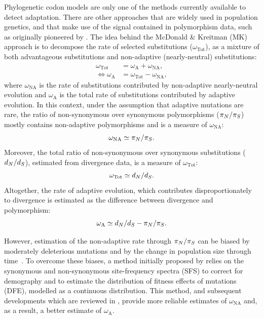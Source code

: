 Phylogenetic \gls{codon} models are only one of the methods currently available to detect adaptation.
There are other approaches that are widely used in population genetics, and that make use of the signal contained in polymorphism data, such as originally pioneered by \citet{McDonald1991}.
The idea behind the McDonald \& Kreitman (\acrshort{MK}) approach is to decompose the rate of selected \glspl{substitution} ($\omega_{\text{Tot}}$), as a mixture of both advantageous \glspl{substitution} and non-adaptive (\gls{nearly-neutral}) \glspl{substitution}:
\begin{align}
    \omega_{\text{Tot}} & = \omega_{\text{A}} + \omega_{\text{NA}}, \\
    \iff \omega_{\text{A}} & = \omega_{\text{Tot}} - \omega_{\text{NA}},
\end{align}
where $\omega_{\text{NA}}$ is the rate of \glspl{substitution} contributed by non-adaptive \gls{nearly-neutral} evolution and $\omega_{\text{A}}$ is the total rate of \glspl{substitution} contributed by adaptive evolution.
In this context, under the assumption that adaptive mutations are rare, the ratio of \gls{non-synonymous} over \gls{synonymous} polymorphisms ($\pi_N / \pi_S$) mostly contains non-adaptive polymorphisms and is a measure of $\omega_{\text{NA}}$:
\begin{equation}
    \omega_{\text{NA}} \simeq \pi_N / \pi_S.
\end{equation}
Moreover, the total ratio of \gls{non-synonymous} over \gls{synonymous} \glspl{substitution} ($d_N / d_S$), estimated from divergence data, is a measure of $\omega_{\text{Tot}}$:
\begin{equation}
    \omega_{\text{Tot}} \simeq d_N / d_S.
\end{equation}
Altogether, the rate of adaptive evolution, which contributes disproportionately to divergence is estimated as the difference between divergence and polymorphism:
\begin{equation}
    \omega_{\text{A}} \simeq d_N / d_S - \pi_N / \pi_S.
\end{equation}

However, estimation of the non-adaptive rate through $\pi_N / \pi_S$ can be biased by moderately deleterious mutations and by the change in population size through time~\citep{eyre-walker_changing_2002}.
To overcome these biases, a method initially proposed by \citet{eyre-walker_estimating_2009, Galtier2016} relies on the \gls{synonymous} and \gls{non-synonymous} site-frequency spectra (\acrshort{SFS}) to correct for demography and to estimate the distribution of fitness effects of mutations (\acrshort{DFE}), modelled as a continuous distribution.
This method, and subsequent developments which are reviewed in \citet{Moutinho2019a}, provide more reliable estimates of $\omega_{\text{NA}}$ and, as a result, a better estimate of $\omega_{\text{A}}$.

